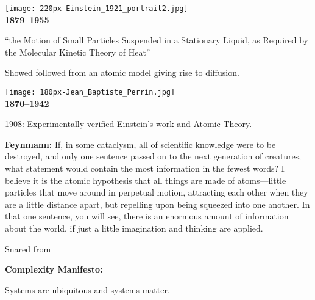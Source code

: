 \begin{frame}[plain]
      
    \texttt{[image: 220px-Einstein\_1921\_portrait2.jpg]}\\
    
    \textbf{
    1879--1955}
    
     
       ``the Motion of Small Particles Suspended in a Stationary Liquid, as Required by the Molecular Kinetic Theory of Heat''\cite{einstein1905a,einstein1956a}
     
      Showed  
      followed from an atomic model giving rise to diffusion.
    
  
  
  \medskip

      
    \texttt{[image: 180px-Jean\_Baptiste\_Perrin.jpg]}\\
    
    \textbf{
        1870--1942}
      
       
        1908: Experimentally verified Einstein's work and Atomic Theory.
      
    
  

  \small

  \textbf{Feynmann:}
    If, in some cataclysm, all of scientific knowledge were to be
    destroyed, and only one sentence passed on to the next generation of
    creatures, what statement would contain the most information in the
    fewest words? I believe it is the atomic hypothesis that all things
    are made of atoms---little particles that move around in perpetual
    motion, attracting each other when they are a little distance apart,
    but repelling upon being squeezed into one another. In that one
    sentence, you will see, there is an enormous amount of information
    about the world, if just a little imagination and thinking are
    applied.
  

  \tiny
  Snared from 



  \small

  \textbf{Complexity Manifesto:}
    
    
      Systems are ubiquitous and systems matter.
    

\end{frame}
